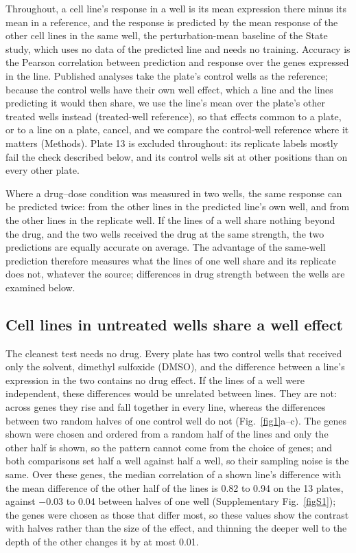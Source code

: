 \documentclass[pdflatex,sn-nature]{sn-jnl}
\begin{document}
Throughout, a cell line's response in a well is its mean expression there minus its mean in a reference, and the response is predicted by the mean response of the other cell lines in the same well, the perturbation-mean baseline of the State study\cite{adduri2025}, which uses no data of the predicted line and needs no training. Accuracy is the Pearson correlation between prediction and response over the genes expressed in the line. Published analyses take the plate's control wells as the reference; because the control wells have their own well effect, which a line and the lines predicting it would then share, we use the line's mean over the plate's other treated wells instead (treated-well reference), so that effects common to a plate, or to a line on a plate, cancel, and we compare the control-well reference where it matters (Methods). Plate 13 is excluded throughout: its replicate labels mostly fail the check described below, and its control wells sit at other positions than on every other plate.

Where a drug--dose condition was measured in two wells, the same response can be predicted twice: from the other lines in the predicted line's own well, and from the other lines in the replicate well. If the lines of a well share nothing beyond the drug, and the two wells received the drug at the same strength, the two predictions are equally accurate on average. The advantage of the same-well prediction therefore measures what the lines of one well share and its replicate does not, whatever the source; differences in drug strength between the wells are examined below.

\subsection{Cell lines in untreated wells share a well effect}

The cleanest test needs no drug. Every plate has two control wells that received only the solvent, dimethyl sulfoxide (DMSO), and the difference between a line's expression in the two contains no drug effect. If the lines of a well were independent, these differences would be unrelated between lines. They are not: across genes they rise and fall together in every line, whereas the differences between two random halves of one control well do not (Fig.~\ref{fig1}a--c). The genes shown were chosen and ordered from a random half of the lines and only the other half is shown, so the pattern cannot come from the choice of genes; and both comparisons set half a well against half a well, so their sampling noise is the same. Over these genes, the median correlation of a shown line's difference with the mean difference of the other half of the lines is 0.82 to 0.94 on the 13 plates, against $-0.03$ to 0.04 between halves of one well (Supplementary Fig.~\ref{figS1}); the genes were chosen as those that differ most, so these values show the contrast with halves rather than the size of the effect, and thinning the deeper well to the depth of the other changes it by at most 0.01.
\end{document}
